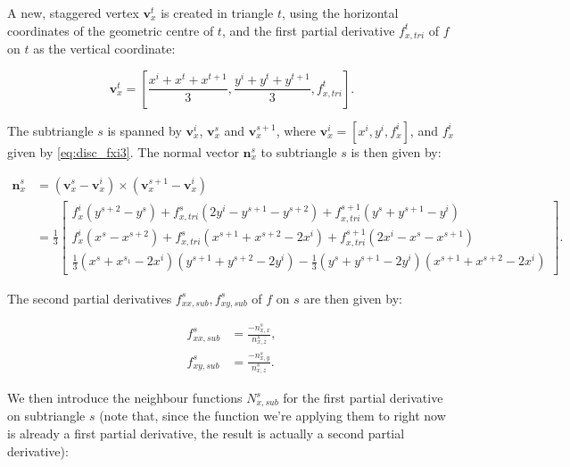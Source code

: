 \documentclass{article}
\begin{document}
A new, staggered vertex $\textbf{v}_x^t$ is created in triangle $t$, using the horizontal coordinates of the geometric centre of $t$, and the first partial derivative $f_{x,tri}^t$ of $f$ on $t$ as the vertical coordinate:

\begin{equation} \label{eq:disc_vxt}
\textbf{v}_x^t = \left[ \frac{x^i + x^t + x^{t+1}}{3}, \frac{y^i + y^t + y^{t+1}}{3}, f_{x,tri}^t \right].
\end{equation}

The subtriangle $s$ is spanned by $\textbf{v}_x^i$, $\textbf{v}_x^s$ and $\textbf{v}_x^{s+1}$, where $\textbf{v}_x^i = \left[ x^i, y^i, f_x^i \right]$, and $f_x^i$ given by \eqref{eq:disc_fxi3}. The normal vector $\textbf{n}_x^s$ to subtriangle $s$ is then given by:

\begin{equation} \label{eq:disc_normvec2}
\begin{split}
\textbf{n}_x^s &= (\textbf{v}_x^s - \textbf{v}_x^i) \times (\textbf{v}_x^{s+1} - \textbf{v}_x^i) \\
 &= \frac{1}{3} \begin{bmatrix}
 f_x^i (y^{s+2} - y^s) + f_{x,tri}^s (2y^i - y^{s+1} - y^{s+2}) + f_{x,tri}^{s+1} (y^s + y^{s+1} - y^i) \\
 f_x^i (x^s - x^{s+2}) + f_{x,tri}^s (x^{s+1} + x^{s+2} - 2x^i) + f_{x,tri}^{s+1} (2x^i - x^s - x^{s+1}) \\
 \frac{1}{3} (x^s +x^{s_1} - 2x^i) (y^{s+1} + y^{s+2} - 2y^i) - \frac{1}{3} (y^s + y^{s+1} - 2y^i) (x^{s+1} +x^{s+2} - 2x^i)
 \end{bmatrix}.
\end{split}
\end{equation}

The second partial derivatives $f_{xx,sub}^s, f_{xy,sub}^s$ of $f$ on $s$ are then given by:

\begin{equation} \label{eq:disc_fxxsub}
\begin{split}
f_{xx,sub}^s &= \frac{-n_{x,x}^s}{n_{x,z}^s}, \\
f_{xy,sub}^s &= \frac{-n_{x,y}^s}{n_{x,z}^s}.
\end{split}
\end{equation}

We then introduce the neighbour functions $N_{x,sub}^s$ for the first partial derivative on subtriangle $s$ (note that, since the function we're applying them to right now is already a first partial derivative, the result is actually a second partial derivative):
\end{document}
